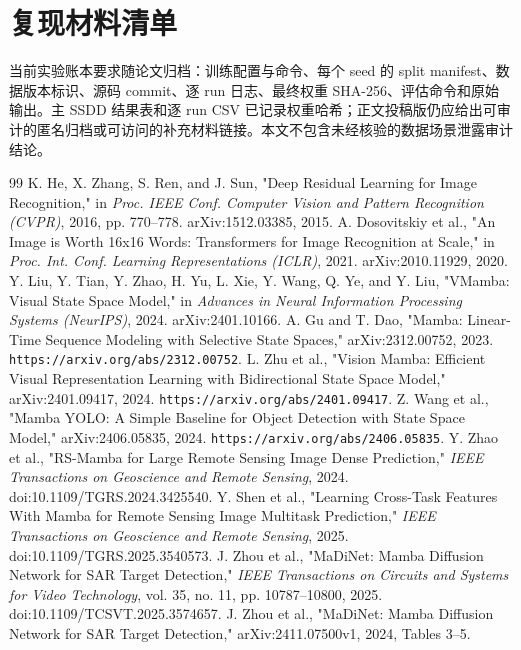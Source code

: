 \documentclass[UTF8,12pt,a4paper]{ctexart}
\begin{document}
\section{复现材料清单}
当前实验账本要求随论文归档：训练配置与命令、每个 seed 的 split manifest、数据版本标识、源码 commit、逐 run 日志、最终权重 SHA-256、评估命令和原始输出。主 SSDD 结果表和逐 run CSV 已记录权重哈希；正文投稿版仍应给出可审计的匿名归档或可访问的补充材料链接。本文不包含未经核验的数据场景泄露审计结论。
{\footnotesize
\setlength{\itemsep}{0pt}
\begin{thebibliography}{99}
K. He, X. Zhang, S. Ren, and J. Sun, "Deep Residual Learning for Image Recognition," in \emph{Proc. IEEE Conf. Computer Vision and Pattern Recognition (CVPR)}, 2016, pp. 770--778. arXiv:1512.03385, 2015.
A. Dosovitskiy et al., "An Image is Worth 16x16 Words: Transformers for Image Recognition at Scale," in \emph{Proc. Int. Conf. Learning Representations (ICLR)}, 2021. arXiv:2010.11929, 2020.
Y. Liu, Y. Tian, Y. Zhao, H. Yu, L. Xie, Y. Wang, Q. Ye, and Y. Liu, "VMamba: Visual State Space Model," in \emph{Advances in Neural Information Processing Systems (NeurIPS)}, 2024. arXiv:2401.10166.
A. Gu and T. Dao, "Mamba: Linear-Time Sequence Modeling with Selective State Spaces," arXiv:2312.00752, 2023. \texttt{https://arxiv.org/abs/2312.00752}.
L. Zhu et al., "Vision Mamba: Efficient Visual Representation Learning with Bidirectional State Space Model," arXiv:2401.09417, 2024. \texttt{https://arxiv.org/abs/2401.09417}.
Z. Wang et al., "Mamba YOLO: A Simple Baseline for Object Detection with State Space Model," arXiv:2406.05835, 2024. \texttt{https://arxiv.org/abs/2406.05835}.
Y. Zhao et al., "RS-Mamba for Large Remote Sensing Image Dense Prediction," \emph{IEEE Transactions on Geoscience and Remote Sensing}, 2024. doi:10.1109/TGRS.2024.3425540.
Y. Shen et al., "Learning Cross-Task Features With Mamba for Remote Sensing Image Multitask Prediction," \emph{IEEE Transactions on Geoscience and Remote Sensing}, 2025. doi:10.1109/TGRS.2025.3540573.
J. Zhou et al., "MaDiNet: Mamba Diffusion Network for SAR Target Detection," \emph{IEEE Transactions on Circuits and Systems for Video Technology}, vol. 35, no. 11, pp. 10787--10800, 2025. doi:10.1109/TCSVT.2025.3574657.
J. Zhou et al., "MaDiNet: Mamba Diffusion Network for SAR Target Detection," arXiv:2411.07500v1, 2024, Tables 3--5.

\end{thebibliography}}
\end{document}

